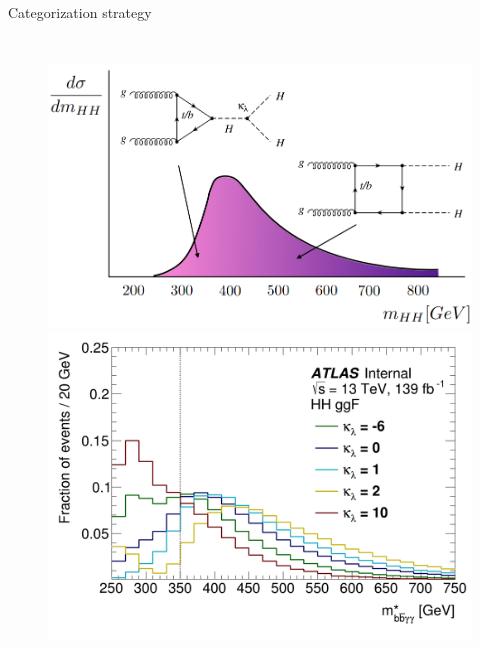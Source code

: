 \begin{frame}{Categorization strategy}
\begin{columns}
\begin{figure}
    \begin{overprint}
    \centering\centering\includegraphics[width=1\textwidth]{Part3/Img/mHH_diagram2.png}
    \centering\includegraphics[width=1\textwidth]{Part3/Img/yybbstar_ggF.png}
    \end{overprint}
\end{figure}
\end{columns}
\end{frame}

